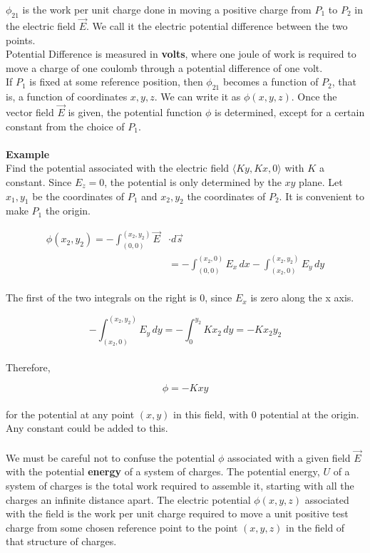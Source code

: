 \documentclass[svgnames]{article}
\begin{document}
$\phi_{21}$ is the work per unit charge done in moving a positive charge from $P_1$ to $P_2$ in the electric field $\vec{E}$. We call it the electric potential difference between the two points. \\ 
Potential Difference is measured in \textbf{volts}, where one joule of work is required to move a charge of one coulomb through a potential difference of one volt. \\
If $P_1$ is fixed at some reference position, then $\phi_{21}$ becomes a function of $P_2$, that is, a function of coordinates $x, y, z$. We can write it as $\phi(x, y, z)$. Once the vector field $\vec{E}$ is given, the potential function $\phi$ is determined, except for a certain constant from the choice of $P_1$. \\ \\

\textbf{Example} \\
Find the potential associated with the electric field $\langle Ky, Kx, 0 \rangle$ with $K$ a constant. Since $E_z = 0$, the potential is only determined by the $xy$ plane. Let $x_1, y_1$ be the coordinates of $P_1$ and $x_2, y_2$ the coordinates of $P_2$. It is convenient to make $P_1$ the origin. 

\begin{align*} 
\phi(x_2, y_2) = -\int_{(0,0)}^{(x_2,y_2)} \vec{E} &\cdot d\vec{s} \\ 
& = - \int_{(0,0)}^{(x_2, 0)} E_x \, dx - \int_{(x_2, 0)}^{(x_2, y_2)} E_y \, dy 
\end{align*} \\

The first of the two integrals on the right is 0, since $E_x$ is zero along the x axis. 

\[ -\int_{(x_2, 0)}^{(x_2, y_2)} E_y \, dy = -\int_0^{y_2} Kx_2\,dy = -Kx_2y_2 \] \\

Therefore, 

\[ \phi = -Kxy \] \\

for the potential at any point $(x,y)$ in this field, with 0 potential at the origin. Any constant could be added to this. \\ \\ 

We must be careful not to confuse the potential $\phi$ associated with a given field $\vec{E}$ with the potential \textbf{energy} of a system of charges. The potential energy, $U$ of a system of charges is the total work required to assemble it, starting with all the charges an infinite distance apart. The electric potential $\phi(x, y, z)$ associated with the field is the work per unit charge required to move a unit positive test charge from some chosen reference point to the point $(x, y, z)$ in the field of that structure of charges. \\
\end{document}
